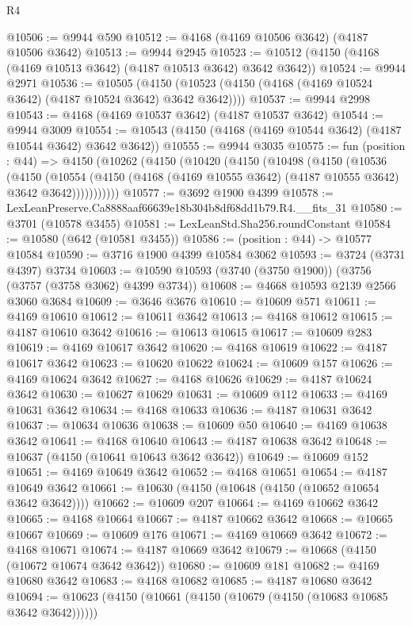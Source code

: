 \begin{lexlean}{R4}
\begin{coremodule}
@10506 := @9944 @590
@10512 := @4168 (@4169 @10506 @3642) (@4187 @10506 @3642)
@10513 := @9944 @2945
@10523 := @10512 (@4150 (@4168 (@4169 @10513 @3642) (@4187 @10513 @3642) @3642 @3642))
@10524 := @9944 @2971
@10536 := @10505
    (@4150 (@10523 (@4150 (@4168 (@4169 @10524 @3642) (@4187 @10524 @3642) @3642 @3642))))
@10537 := @9944 @2998
@10543 := @4168 (@4169 @10537 @3642) (@4187 @10537 @3642)
@10544 := @9944 @3009
@10554 := @10543 (@4150 (@4168 (@4169 @10544 @3642) (@4187 @10544 @3642) @3642 @3642))
@10555 := @9944 @3035
@10575 := fun (position : @44) =>
  @4150
    (@10262
      (@4150
        (@10420
          (@4150
            (@10498
              (@4150
                (@10536
                  (@4150
                    (@10554
                      (@4150 (@4168 (@4169 @10555 @3642) (@4187 @10555 @3642) @3642 @3642)))))))))))
@10577 := @3692 @1900 @4399
@10578 := LexLeanPreserve.Ca8888aaf66639e18b304b8df68dd1b79.R4.__fits_31
@10580 := @3701 (@10578 @3455)
@10581 := LexLeanStd.Sha256.roundConstant
@10584 := @10580 (@642 (@10581 @3455))
@10586 := (position : @44) -> @10577 @10584
@10590 := @3716 @1900 @4399 @10584 @3062
@10593 := @3724 (@3731 @4397) @3734
@10603 := @10590 @10593 (@3740 (@3750 @1900)) (@3756 (@3757 (@3758 @3062) @4399 @3734))
@10608 := @4668 @10593 @2139 @2566 @3060 @3684
@10609 := @3646 @3676
@10610 := @10609 @571
@10611 := @4169 @10610
@10612 := @10611 @3642
@10613 := @4168 @10612
@10615 := @4187 @10610 @3642
@10616 := @10613 @10615
@10617 := @10609 @283
@10619 := @4169 @10617 @3642
@10620 := @4168 @10619
@10622 := @4187 @10617 @3642
@10623 := @10620 @10622
@10624 := @10609 @157
@10626 := @4169 @10624 @3642
@10627 := @4168 @10626
@10629 := @4187 @10624 @3642
@10630 := @10627 @10629
@10631 := @10609 @112
@10633 := @4169 @10631 @3642
@10634 := @4168 @10633
@10636 := @4187 @10631 @3642
@10637 := @10634 @10636
@10638 := @10609 @50
@10640 := @4169 @10638 @3642
@10641 := @4168 @10640
@10643 := @4187 @10638 @3642
@10648 := @10637 (@4150 (@10641 @10643 @3642 @3642))
@10649 := @10609 @152
@10651 := @4169 @10649 @3642
@10652 := @4168 @10651
@10654 := @4187 @10649 @3642
@10661 := @10630 (@4150 (@10648 (@4150 (@10652 @10654 @3642 @3642))))
@10662 := @10609 @207
@10664 := @4169 @10662 @3642
@10665 := @4168 @10664
@10667 := @4187 @10662 @3642
@10668 := @10665 @10667
@10669 := @10609 @176
@10671 := @4169 @10669 @3642
@10672 := @4168 @10671
@10674 := @4187 @10669 @3642
@10679 := @10668 (@4150 (@10672 @10674 @3642 @3642))
@10680 := @10609 @181
@10682 := @4169 @10680 @3642
@10683 := @4168 @10682
@10685 := @4187 @10680 @3642
@10694 := @10623 (@4150 (@10661 (@4150 (@10679 (@4150 (@10683 @10685 @3642 @3642))))))

\end{coremodule}
\end{lexlean}
